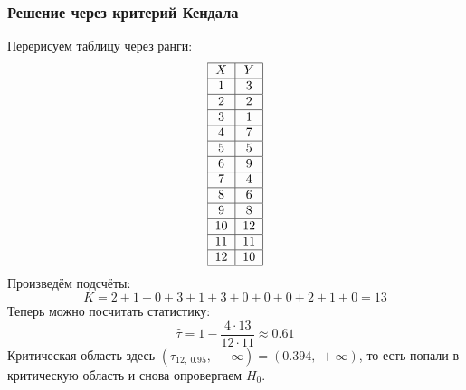 \documentclass[12pt, a4paper]{article}
\newcommand{\oo}{\infty}
\begin{document}
\subsubsection*{Решение через критерий Кендала}
Перерисуем таблицу через ранги:
\[\begin{tabular}{|c|c|}
    \hline
    $X$ & $Y$\\
    \hline
    1 & 3\\
    \hline
    2 & 2\\
    \hline
    3 & 1\\
    \hline
    4 & 7\\
    \hline
    5 & 5\\
    \hline
    6 & 9\\
    \hline
    7 & 4\\
    \hline
    8 & 6\\
    \hline
    9 & 8\\
    \hline
    10 & 12\\
    \hline
    11 & 11\\
    \hline
    12 & 10\\
    \hline
\end{tabular}\]
Произведём подсчёты:
\[K = 2 + 1 + 0 + 3 + 1 + 3 + 0 + 0 + 0 + 2 + 1 + 0 = 13\]
Теперь можно посчитать статистику:
\[\hat \tau = 1 - \frac{4 \cdot 13}{12\cdot 11} \approx 0.61\]
Критическая область здесь $(\tau_{12,\ 0.95},\ +\oo) = (0.394,\ +\oo)$, то есть попали в критическую область и снова опровергаем $H_0$.
\end{document}
